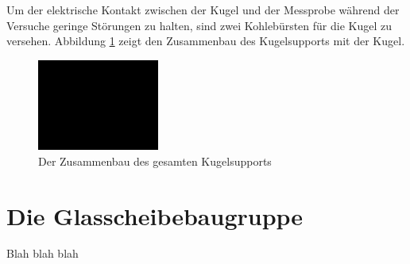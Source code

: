 Um der elektrische Kontakt zwischen der Kugel und der Messprobe während der Versuche geringe Störungen zu halten, sind zwei Kohlebürsten für die Kugel zu versehen.
Abbildung \ref{fig:der_zusammenbau_des_gesamten_kugelsupports} zeigt den Zusammenbau des Kugelsupports mit der Kugel.
\begin{figure}[htb]
    \centering
    \includegraphics[width=4cm]{./images/blank_img.jpg}
    \caption{Der Zusammenbau des gesamten Kugelsupports}
    \label{fig:der_zusammenbau_des_gesamten_kugelsupports}
\end{figure}
%

\section{Die Glasscheibebaugruppe}
\label{sec:die_glasscheibebaugruppe}

Blah blah blah
